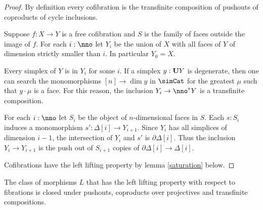 \documentclass{tac}
\newcommand\ri{^*}
\newcommand\of{:}
\newcommand\simplex\Delta
\newcommand\cycle{\partial\Delta}
\begin{document}
\begin{proof} By definition every cofibration is the transfinite composition of pushouts of coproducts of cycle inclusions.

Suppose $f\of X\to Y$ is a free cofibration and $S$ is the family of faces outside the image of $f$. For each $i\of\nno$ let $Y_i$ be the union of $X$ with all faces of $Y$ of dimension strictly smaller than $i$. In particular $Y_0=X$.

Every simplex of $Y$ is in $Y_i$ for some $i$. If a simplex $y\of\base Y$ is degenerate, then one can search the monomorphisms $[n]\to\dim y$ in $\simCat$ for the greatest $\mu$ such that $y\cdot\mu$ is a face. For this reason, the inclusion $Y_i\to\nno\ri Y$ is a transfinite composition.

For each $i\of\nno$ let $S_i$ be the object of $n$-dimensional faces in $S$. Each $s\of S_i$ induces a monomorphism $s'\of\simplex[i]\to Y_{i+1}$. Since $Y_{i}$ has all simplices of dimension $i-1$, the intersection of $Y_i$ and $s'$ is $\cycle[i]$. Thus the inclusion $Y_i\to Y_{i+1}$ is the push out of $S_{i+1}$ copies of $\cycle[i]\to\simplex[i]$. 

Cofibrations have the left lifting property by lemma \ref{saturation} below.
\end{proof}


\begin{lemma} The class of morphisms $L$ that has the left lifting property with respect to fibrations is closed under pushouts, coproducts over projectives and transfinite compositions. \label{saturation}
\end{lemma}
\end{document}

